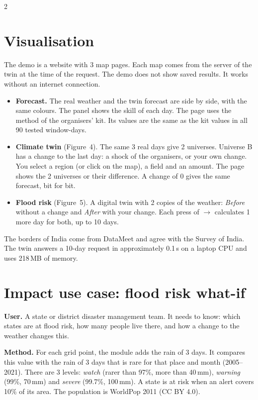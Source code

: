 \documentclass[10pt]{article}
\begin{document}
\begin{multicols}{2}

\section{Visualisation}
The demo is a website with 3 map pages. Each map comes from the server of the twin at the time of the request.
The demo does not show saved results. It works without an internet connection.

\begin{itemize}
\item \textbf{Forecast.} The real weather and the twin forecast are side by side, with the same colours. The panel
  shows the skill of each day. The page uses the method of the organisers' kit. Its values are the same as the kit
  values in all 90 tested window-days.
\item \textbf{Climate twin} (Figure~4). The same 3 real days give 2 universes. Universe B has a change to the last day:
  a shock of the organisers, or your own change. You select a region (or click on the map), a field and an amount.
  The page shows the 2 universes or their difference. A change of 0 gives the same forecast, bit for bit.
\item \textbf{Flood risk} (Figure~5). A digital twin with 2 copies of the weather: \emph{Before} without a change
  and \emph{After} with your change. Each press of $\rightarrow$ calculates 1 more day for both, up to 10 days.
\end{itemize}
The borders of India come from DataMeet and agree with the Survey of India. The twin answers a 10-day request in
approximately 0.1\,s on a laptop CPU and uses 218\,MB of memory.

\section{Impact use case: flood risk what-if}
\textbf{User.} A state or district disaster management team. It needs to know: which states are at flood risk, how
many people live there, and how a change to the weather changes this.

\textbf{Method.} For each grid point, the module adds the rain of 3 days. It compares this value with the rain of
3 days that is rare for that place and month (2005--2021). There are 3 levels: \emph{watch} (rarer than 97\%, more than
40\,mm), \emph{warning} (99\%, 70\,mm) and \emph{severe} (99.7\%, 100\,mm). A state is at risk when an alert covers
10\% of its area. The population is WorldPop 2011 (CC BY 4.0).


\end{multicols}
\end{document}
